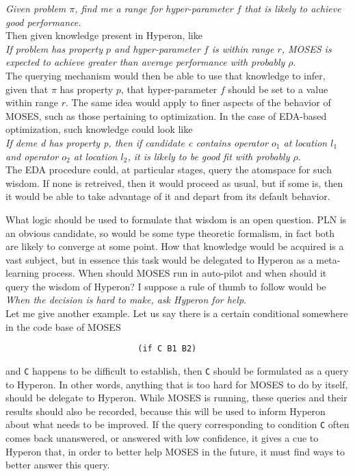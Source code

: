 \documentclass[]{report}
\begin{document}
\emph{Given problem $\pi$, find me a range for hyper-parameter $f$
that is likely to achieve good performance.}\\

Then given knowledge present in Hyperon, like\\

\emph{If problem has property $p$ and hyper-parameter $f$ is within
range $r$, MOSES is expected to achieve greater than average
performance with probably $\rho$}.\\

The querying mechanism would then be able to use that knowledge to
infer, given that $\pi$ has property $p$, that hyper-parameter $f$
should be set to a value within range $r$.  The same idea would apply
to finer aspects of the behavior of MOSES, such as those pertaining to
optimization.  In the case of EDA-based optimization, such knowledge
could look like\\

\emph{If deme d has property p, then if candidate c contains operator
$o_1$ at location $l_1$ and operator $o_2$ at location $l_2$, it is
likely to be good fit with probably $\rho$}.\\

The EDA procedure could, at particular stages, query the atomspace for
such wisdom.  If none is retreived, then it would proceed as usual,
but if some is, then it would be able to take advantage of it and
depart from its default behavior.

What logic should be used to formulate that wisdom is an open
question.  PLN is an obvious candidate, so would be some type
theoretic formalism, in fact both are likely to converge at some
point.  How that knowledge would be acquired is a vast subject, but in
essence this task would be delegated to Hyperon as a meta-learning
process.  When should MOSES run in auto-pilot and when should it query
the wisdom of Hyperon?  I suppose a rule of thumb to follow would be\\

\emph{When the decision is hard to make, ask Hyperon for help}.\\

Let me give another example.  Let us say there is a certain
conditional somewhere in the code base of MOSES

\begin{verbatim}
                           (if C B1 B2)
\end{verbatim}
and \texttt{C} happens to be difficult to establish, then
\texttt{C} should be formulated as a query to Hyperon.  In
other words, anything that is too hard for MOSES to do by itself,
should be delegate to Hyperon.  While MOSES is running, these queries
and their results should also be recorded, because this will be used
to inform Hyperon about what needs to be improved.  If the query
corresponding to condition \texttt{C} often comes back unanswered, or
answered with low confidence, it gives a cue to Hyperon that, in order
to better help MOSES in the future, it must find ways to better answer
this query.
\end{document}
